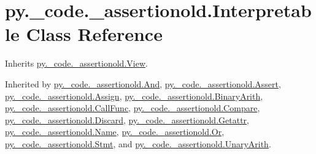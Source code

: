 \hypertarget{classpy_1_1__code_1_1__assertionold_1_1_interpretable}{}\section{py.\+\_\+code.\+\_\+assertionold.\+Interpretable Class Reference}
\label{classpy_1_1__code_1_1__assertionold_1_1_interpretable}


Inherits \hyperlink{classpy_1_1__code_1_1__assertionold_1_1_view}{py.\+\_\+code.\+\_\+assertionold.\+View}.



Inherited by \hyperlink{classpy_1_1__code_1_1__assertionold_1_1_and}{py.\+\_\+code.\+\_\+assertionold.\+And}, \hyperlink{classpy_1_1__code_1_1__assertionold_1_1_assert}{py.\+\_\+code.\+\_\+assertionold.\+Assert}, \hyperlink{classpy_1_1__code_1_1__assertionold_1_1_assign}{py.\+\_\+code.\+\_\+assertionold.\+Assign}, \hyperlink{classpy_1_1__code_1_1__assertionold_1_1_binary_arith}{py.\+\_\+code.\+\_\+assertionold.\+Binary\+Arith}, \hyperlink{classpy_1_1__code_1_1__assertionold_1_1_call_func}{py.\+\_\+code.\+\_\+assertionold.\+Call\+Func}, \hyperlink{classpy_1_1__code_1_1__assertionold_1_1_compare}{py.\+\_\+code.\+\_\+assertionold.\+Compare}, \hyperlink{classpy_1_1__code_1_1__assertionold_1_1_discard}{py.\+\_\+code.\+\_\+assertionold.\+Discard}, \hyperlink{classpy_1_1__code_1_1__assertionold_1_1_getattr}{py.\+\_\+code.\+\_\+assertionold.\+Getattr}, \hyperlink{classpy_1_1__code_1_1__assertionold_1_1_name}{py.\+\_\+code.\+\_\+assertionold.\+Name}, \hyperlink{classpy_1_1__code_1_1__assertionold_1_1_or}{py.\+\_\+code.\+\_\+assertionold.\+Or}, \hyperlink{classpy_1_1__code_1_1__assertionold_1_1_stmt}{py.\+\_\+code.\+\_\+assertionold.\+Stmt}, and \hyperlink{classpy_1_1__code_1_1__assertionold_1_1_unary_arith}{py.\+\_\+code.\+\_\+assertionold.\+Unary\+Arith}.

